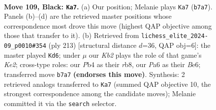 \documentclass[11pt]{article}
\begin{document}
\begin{figure}[p]\centering
\begin{subfigure}{0.46\textwidth}\centering
\resizebox{\linewidth}{!}{%
\newchessgame
\chessboard[
  setfen={8/1k6/p5r1/P1p2p1p/1p3P1P/1P2PKPR/8/8 b - - 6 109},
  showmover=false,
  pgfstyle=straightmove, color=movearrow, markmove={b7-a7}
]}
\caption{}
\end{subfigure}\hfill
\begin{subfigure}{0.46\textwidth}\centering
\resizebox{\linewidth}{!}{%
\newchessgame
\chessboard[
  setfen={1R6/4k3/4b1p1/2p4p/p1r4P/P1B2PK1/1P4P1/8 b - - 35 107},
  showmover=false,
  pgfstyle=straightmove, color=movearrow, markmove={e7-d6}
]}
\caption{}
\end{subfigure}
\\[4pt]

\caption{\textbf{Move 109, Black: \texttt{Ka7}.} (a) Our position; Melanie plays \texttt{Ka7} (\texttt{b7a7}). Panels (b)--(d) are the retrieved master positions whose correspondence most drove this move (highest QAP objective among those that transfer to it). (b) Retrieved from \texttt{lichess\_elite\_2024-09\_p0010\#354} (ply 213) [structural distance $d$=36, QAP obj=6]: the master played \texttt{Kd6}; under $\mu$ our \emph{Kb2} plays the role of that game's \emph{Ke2}; cross-type roles: our \emph{P}b4 as their \emph{r}b8, our \emph{P}a6 as their \emph{B}e6; transferred move \texttt{b7a7} \textbf{(endorses this move)}. Synthesis: 2 retrieved analogs transferred to \texttt{Ka7} (summed QAP objective 10, the strongest correspondence among the candidate moves); Melanie committed it via the \texttt{search} selector.}
\label{fig:thought-m217}
\end{figure}

\clearpage
\end{document}
